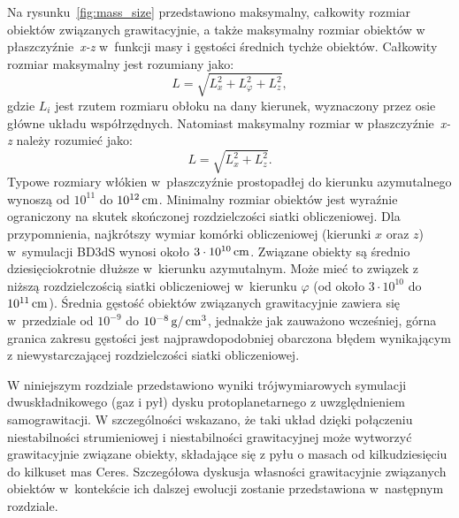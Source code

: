 %
\par Na rysunku~\ref{fig:mass_size} przedstawiono maksymalny, całkowity rozmiar
obiektów związanych grawitacyjnie, a także maksymalny rozmiar obiektów w
płaszczyźnie~\emph{x-z} w~funkcji masy i gęstości średnich tychże obiektów.
Całkowity rozmiar maksymalny jest rozumiany jako:
%
\begin{equation}
   L = \sqrt{L_x^2 + L_\varphi^2 + L_z^2},
\end{equation}
%
gdzie $L_i$ jest rzutem rozmiaru obłoku na dany kierunek, wyznaczony przez osie
główne układu współrzędnych. Natomiast maksymalny rozmiar w
płaszczyźnie~\emph{x-z} należy rozumieć jako:
%
\begin{equation}
   L = \sqrt{L_x^2 + L_z^2}.
\end{equation}
%
Typowe rozmiary włókien w~płaszczyźnie prostopadłej do kierunku azymutalnego
wynoszą od $10^{11}$ do $10^{12}\hbox{$\thinspace\textrm{cm}$}$. Minimalny rozmiar obiektów jest wyraźnie
ograniczony na skutek skończonej rozdzielczości siatki obliczeniowej. Dla
przypomnienia, najkrótszy wymiar komórki obliczeniowej (kierunki $x$ oraz $z$)
w~symulacji BD3dS wynosi około $3\cdot10^{10}\hbox{$\thinspace\textrm{cm}$}$. Związane obiekty są średnio
dziesięciokrotnie dłuższe w~kierunku azymutalnym. Może mieć to związek z niższą
rozdzielczością siatki obliczeniowej w~kierunku $\varphi$ (od około
$3\cdot10^{10}$ do $10^{11}\hbox{$\thinspace\textrm{cm}$}$). Średnia gęstość obiektów związanych
grawitacyjnie zawiera się w~przedziale od $10^{-9}$ do $10^{-8}\hbox{$\thinspace\textrm{g}$}/\hbox{$\thinspace\textrm{cm}$}^{3}$,
jednakże jak zauważono wcześniej, górna granica zakresu gęstości jest
najprawdopodobniej obarczona błędem wynikającym z niewystarczającej
rozdzielczości siatki obliczeniowej.
%
\par W niniejszym rozdziale przedstawiono wyniki trójwymiarowych symulacji
dwuskładnikowego (gaz i pył) dysku protoplanetarnego z uwzględnieniem
samograwitacji. W szczególności wskazano, że taki układ dzięki połączeniu
niestabilności strumieniowej i niestabilności grawitacyjnej może wytworzyć
grawitacyjnie związane obiekty, składające się z pyłu o masach od kilkudziesięciu
do kilkuset mas Ceres. Szczegółowa dyskusja własności grawitacyjnie związanych
obiektów w~kontekście ich dalszej ewolucji zostanie przedstawiona w~następnym
rozdziale.
%
